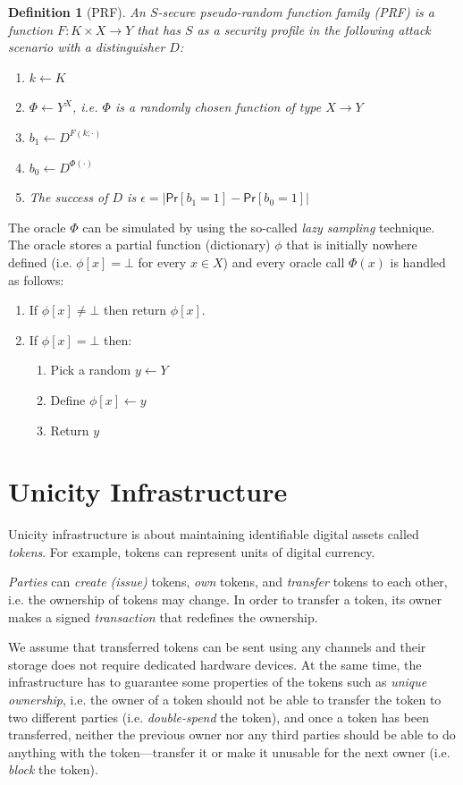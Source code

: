 \documentclass{article}
\newtheorem{definition}{Definition}[section]
\begin{document}
\begin{definition}[PRF] An $S$-secure \emph{pseudo-random function family (PRF)} is a function $F\colon K\times X \rightarrow Y$ that has $S$ as a security profile in the following attack scenario with a distinguisher $D$:
\begin{enumerate}
\item $k\gets K$
\item $\Phi\gets Y^X$, i.e. $\Phi$ is a randomly chosen function of type $X\rightarrow Y$
\item $b_1\gets D^{F(k;\cdot)}$
\item $b_0\gets D^{\Phi(\cdot)}$
\item The success of $D$ is
$\epsilon=|\mathsf{Pr}[b_1=1]-\mathsf{Pr}[b_0=1]|$
\end{enumerate}
\end{definition}
The oracle $\Phi$ can be simulated by using the so-called \emph{lazy sampling} technique. The oracle stores a partial function (dictionary) $\phi$
that is initially nowhere defined (i.e. $\phi[x]=\bot$ for every $x\in X$) and every oracle call $\Phi(x)$ is handled as follows:
\begin{enumerate}
\item If $\phi[x]\neq \bot$ then return $\phi[x]$.
\item If $\phi[x]=\bot$ then:
\begin{enumerate}
\item Pick a random $y\gets Y$
\item Define $\phi[x]\gets y$
\item Return $y$
\end{enumerate}
\end{enumerate}



\section{Unicity Infrastructure}\label{sec:infrastructure}

Unicity infrastructure is about maintaining identifiable digital assets called \emph{tokens}. For example, tokens can represent units of digital currency.

\emph{Parties} can \emph{create (issue)} tokens, \emph{own} tokens, and \emph{transfer} tokens to each other, i.e. the ownership of tokens may change. In order to transfer a token, its owner makes a signed \emph{transaction} that redefines the ownership.

We assume that transferred tokens can be sent using any channels and their storage does not require dedicated hardware devices. At the same time, the infrastructure has to guarantee some properties of the tokens such as \emph{unique ownership}, i.e. the owner of a token should not be able to transfer the token to two different parties (i.e. \emph{double-spend} the token), and once a token has been transferred, neither the previous owner nor any third parties should be able to do anything with the token---transfer it or make it unusable for the next owner (i.e. \emph{block} the token).
\end{document}
